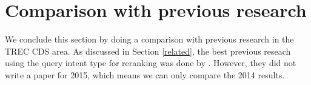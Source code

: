 % 
% 
% 

\section{Comparison with previous research}
We conclude this section by doing a comparison with previous research in the TREC CDS area. 
As discussed in Section \ref{related}, the best previous reseach using the query intent type for reranking
was done by \cite{choi}. However, they did not write a paper for 2015, which means we can only compare the 2014 results.

